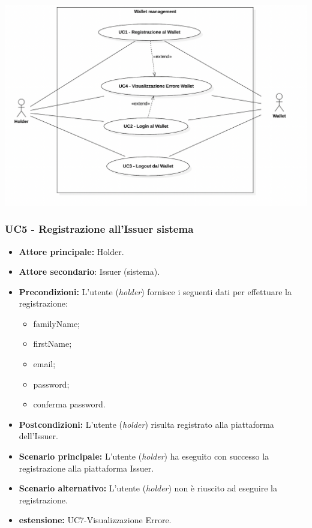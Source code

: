 \begin{center}
  \includegraphics[scale = 0.65]{./res/img/UC1.PNG}
\end{center}

\subsubsection{UC5 - Registrazione all'Issuer sistema}
\begin{itemize}
\item \textbf{Attore principale:} Holder.
\item \textbf{Attore secondario}: Issuer (sistema). 
\item \textbf{Precondizioni:} L’utente (\textit{holder}) fornisce i seguenti dati per effettuare la registrazione:
\begin{itemize}
    \item familyName;
    \item firstName;
    \item email;
    \item password;
    \item conferma password.
\end{itemize}
\item \textbf{Postcondizioni:} L’utente (\textit{holder}) risulta registrato alla piattaforma dell'Issuer.
\item \textbf{Scenario principale:} L'utente (\textit{holder}) ha eseguito con successo la registrazione alla piattaforma Issuer.
\item \textbf{Scenario alternativo:} L'utente (\textit{holder}) non è riuscito ad eseguire la registrazione.
\item \textbf{estensione:} UC7-Visualizzazione Errore.
\end{itemize}

